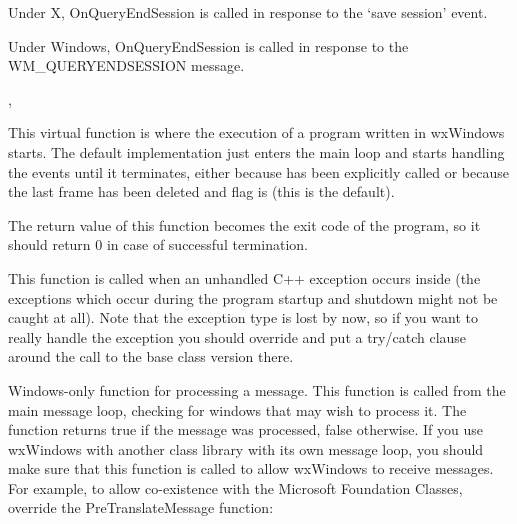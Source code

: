 Under X, OnQueryEndSession is called in response to the `save session' event.

Under Windows, OnQueryEndSession is called in response to the WM\_QUERYENDSESSION message.


,\rtfsp
{}\rtfsp


\label{wxapponrun}


This virtual function is where the execution of a program written in wxWindows
starts. The default implementation just enters the main loop and starts
handling the events until it terminates, either because 
 has been explicitly called or because
the last frame has been deleted and 
 flag is \true (this
is the default).

The return value of this function becomes the exit code of the program, so it
should return $0$ in case of successful termination.


\label{wxapponunhandledexception}


This function is called when an unhandled C++ exception occurs inside 
 (the exceptions which occur during the program
startup and shutdown might not be caught at all).
Note that the exception type is lost by now, so if you want to really handle
the exception you should override  and put a
try/catch clause around the call to the base class version there.


\label{wxappprocessmessage}


Windows-only function for processing a message. This function
is called from the main message loop, checking for windows that
may wish to process it. The function returns true if the message
was processed, false otherwise. If you use wxWindows with another class
library with its own message loop, you should make sure that this
function is called to allow wxWindows to receive messages. For example,
to allow co-existence with the Microsoft Foundation Classes, override
the PreTranslateMessage function:


